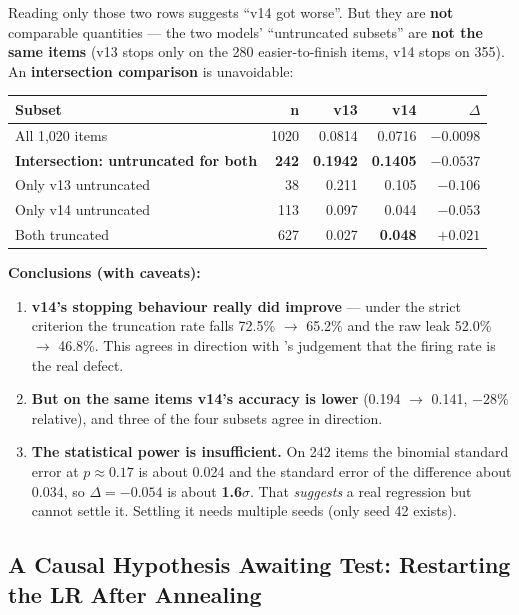 Reading only those two rows suggests ``v14 got worse''. But they are \textbf{not} comparable
quantities --- the two models' ``untruncated subsets'' are \textbf{not the same items} (v13
stops only on the 280 easier-to-finish items, v14 stops on 355). An \textbf{intersection
comparison} is unavoidable:

\begin{center}\small
\begin{tabular}{@{}>{\RaggedRight\arraybackslash}p{}rrrr@{}}
\toprule
\textbf{Subset} & \textbf{n} & \textbf{v13} & \textbf{v14} & \textbf{$\Delta$} \\
\midrule
All 1,020 items & 1020 & 0.0814 & 0.0716 & $-0.0098$ \\
\textbf{Intersection: untruncated for both} & \textbf{242} & \textbf{0.1942} & \textbf{0.1405} &
\textbf{$-0.0537$} \\
Only v13 untruncated & 38 & 0.211 & 0.105 & $-0.106$ \\
Only v14 untruncated & 113 & 0.097 & 0.044 & $-0.053$ \\
Both truncated & 627 & 0.027 & \textbf{0.048} & \textbf{$+0.021$} \\
\bottomrule
\end{tabular}
\end{center}

\textbf{Conclusions (with caveats):}

\begin{enumerate}
\item \textbf{v14's stopping behaviour really did improve} --- under the strict criterion the
      truncation rate falls 72.5\% $\rightarrow$ 65.2\% and the raw leak 52.0\% $\rightarrow$
      46.8\%. This agrees in direction with 's judgement that the firing rate is
      the real defect.
\item \textbf{But on the same items v14's accuracy is lower} (0.194 $\rightarrow$ 0.141, $-28\%$
      relative), and three of the four subsets agree in direction.
\item \textbf{The statistical power is insufficient.} On 242 items the binomial standard error
      at $p \approx 0.17$ is about 0.024 and the standard error of the difference about 0.034,
      so $\Delta = -0.054$ is about \textbf{1.6$\sigma$}. That \emph{suggests} a real
      regression but cannot settle it. Settling it needs multiple seeds (only seed 42 exists).
\end{enumerate}

\subsection{A Causal Hypothesis Awaiting Test: Restarting the LR After Annealing}
\label{sec:en-eval-hypothesis}

